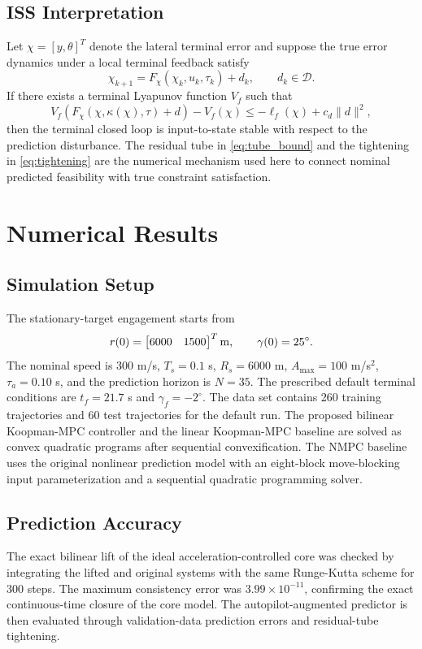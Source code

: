 \documentclass[letterpaper,journal]{IEEEtran}
\begin{document}
\subsection{ISS Interpretation}
Let $\chi=[y,\theta]^T$ denote the lateral terminal error and suppose the true error dynamics under a local terminal feedback satisfy
\begin{equation}
    \chi_{k+1}=F_\chi(\chi_k,u_k,\tau_k)+d_k,\qquad d_k\in\mathcal D .
\end{equation}
If there exists a terminal Lyapunov function $V_f$ such that
\begin{equation}
    V_f(F_\chi(\chi,\kappa(\chi),\tau)+d)-V_f(\chi)
    \le -\ell_f(\chi)+c_d\|d\|^2 ,
    \label{eq:iss_condition}
\end{equation}
then the terminal closed loop is input-to-state stable with respect to the prediction disturbance. The residual tube in \eqref{eq:tube_bound} and the tightening in \eqref{eq:tightening} are the numerical mechanism used here to connect nominal predicted feasibility with true constraint satisfaction.

\section{Numerical Results}

\subsection{Simulation Setup}
The stationary-target engagement starts from
\begin{equation}
    r(0)=
    \begin{bmatrix}
    6000&1500
    \end{bmatrix}^T{\rm m},\qquad
    \gamma(0)=25^\circ .
\end{equation}
The nominal speed is $300$ m/s, $T_s=0.1$ s, $R_s=6000$ m, $A_{\max}=100$ m/s$^2$, $\tau_a=0.10$ s, and the prediction horizon is $N=35$. The prescribed default terminal conditions are $t_f=21.7$ s and $\gamma_f=-2^\circ$. The data set contains 260 training trajectories and 60 test trajectories for the default run. The proposed bilinear Koopman-MPC controller and the linear Koopman-MPC baseline are solved as convex quadratic programs after sequential convexification. The NMPC baseline uses the original nonlinear prediction model with an eight-block move-blocking input parameterization and a sequential quadratic programming solver.

\subsection{Prediction Accuracy}
The exact bilinear lift of the ideal acceleration-controlled core was checked by integrating the lifted and original systems with the same Runge-Kutta scheme for 300 steps. The maximum consistency error was $3.99\times10^{-11}$, confirming the exact continuous-time closure of the core model. The autopilot-augmented predictor is then evaluated through validation-data prediction errors and residual-tube tightening.
\end{document}
